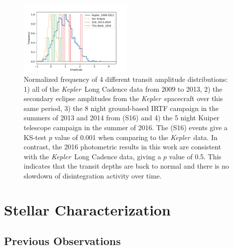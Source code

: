 \documentclass[preprint]{aastex61}
\newcommand{\kepler}{{\it Kepler}}
\begin{document}
\begin{figure}[!hbtp]
\begin{centering}
\includegraphics[width=0.49\textwidth]{images/kepler/amp_distributions_comparison.pdf}
\caption{Normalized frequency of 4 different transit amplitude distributions: 1) all of the \kepler\ Long Cadence data from 2009 to 2013, 2) the secondary eclipse amplitudes from the \kepler\ spacecraft over this same period, 3) the 8 night ground-based IRTF campaign in the summers of 2013 and 2014 from \citet{schlawin2016kic1255} (S16) and 4) the 5 night Kuiper telescope campaign in the summer of 2016.
The \citet{schlawin2016kic1255} (S16) events give a KS-test $p$ value of 0.001 when comparing to the \kepler\ data.
In contrast, the 2016 photometric results in this work are consistent with the \kepler\ Long Cadence data, giving a  $p$ value of 0.5.
This indicates that the transit depths are back to normal and there is no slowdown of disintegration activity over time.}\label{fig:histoPhot}
\end{centering}
\end{figure}

\section{Stellar Characterization}
\subsection{Previous Observations}
\end{document}
